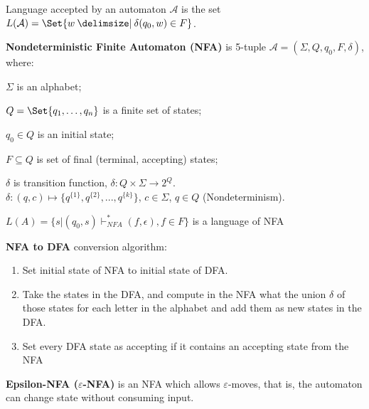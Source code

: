 \documentclass[a4paper,10pt]{article}
\begin{document}
\begin{terms}
    \item Language accepted by an automaton $\mathcal{A}$ is the set $L(\mathcal{A}) = \Set{w \given \delta(q_0, w) \in F}$.

\newpage

    \item \textbf{Nondeterministic Finite Automaton (NFA)} is 5-tuple $\mathcal{A} = (\Sigma, Q, q_0, F, \delta)$, where:

    \begin{terms}
        \item $\Sigma$ is an alphabet;

        \item $Q = \Set{q_1, \dots, q_n}$ is a finite set of states;

        \item $q_0 \in Q$ is an initial state;

        \item $F \subseteq Q$ is set of final (terminal, accepting) states;

        \item $\delta$ is transition function, $\delta: Q \times \Sigma \to 2^Q$.\\
        $\delta: (q,c) \mapsto \{q^{\{1\}},q^{\{2\}}, ... , q^{\{k\}}\}$, $c \in \Sigma$, $q \in Q$ (Nondeterminism).

        \item $L(A) = \{ s| (q_0, s) \vdash^*_{NFA} (f, \epsilon), f\in F\}$ is a language of NFA
    \end{terms}

    \item \textbf{NFA to DFA} conversion algorithm:

    \begin{enumerate}
        \item Set initial state of NFA to initial state of DFA.

        \item Take the states in the DFA, and compute in the NFA what the union $\delta$ of those states for each letter in the alphabet and add them as new states in the DFA.

        \item Set every DFA state as accepting if it contains an accepting state from the NFA
    \end{enumerate}

    \item \textbf{Epsilon-NFA ($\varepsilon$-NFA)} is an NFA which allows $\varepsilon$-moves, that is, the automaton can change state without consuming input.


\end{terms}
\end{document}
